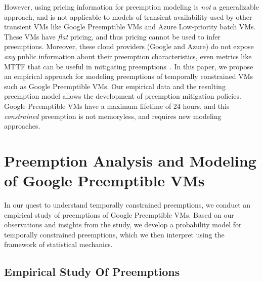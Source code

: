 \documentclass[compsoc]{IEEEtran}
\newcommand{\eat}[1]{}
\newcommand{\subsecspace}[0]{-0.20cm}
\begin{document}
However, using pricing information for preemption modeling is \emph{not} a generalizable approach, and is not applicable to models of transient availability used by other transient VMs like Google Preemptible VMs and Azure Low-priority batch VMs. 
These VMs have \emph{flat} pricing, and thus pricing cannot be used to infer preemptions. 
Moreover, these cloud providers (Google and Azure) do not expose \emph{any} public information about their preemption characteristics, even metrics like MTTF that can be useful in mitigating preemptions~\cite{chien-ic2e19, tian_gpu_icdcs}. 
In this paper, we propose an empirical approach for modeling preemptions of temporally constrained VMs such as Google Preemptible VMs.
Our empirical data and the resulting preemption model allows the development of preemption mitigation policies. 
Google Preemptible VMs have a maximum lifetime of 24 hours, and this \emph{constrained} preemption is not memoryless, and requires new modeling approaches. 














 
\section{Preemption Analysis and Modeling of Google Preemptible VMs}
\label{sec:failmodel}


\eat{In order to understand and improve the performance of applications running on transient cloud servers, we must understand the nature and dynamics of their preemptions.
The preemption characteristics are governed by the supply of surplus resources, the demand for cloud resources, and the resource allocation policies enforced by the cloud operator.
Therefore, in this section, we present empirical and analytical models to help us understand the nature of preemptions. 
}


In our quest to understand temporally constrained preemptions, we  conduct an empirical study of preemptions of Google Preemptible VMs.
Based on our observations and insights from the study, we develop a probability model for temporally constrained preemptions, 
which we then interpret using the framework of statistical mechanics. 

\vspace*{\subsecspace}
\subsection{Empirical Study Of Preemptions}\label{sec:empirical}
\end{document}
